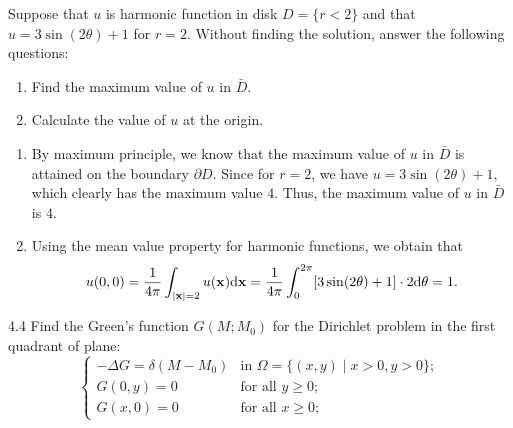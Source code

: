 \begin{question}{4.3}{}
    Suppose that $u$ is harmonic function in disk $D=\{r<2\}$ and that $u=3\sin(2\theta)+1$ for $r=2$. Without finding the solution, answer the following questions:
    \begin{enumerate}[label=(\alph*)]
        \item Find the maximum value of $u$ in $\bar{D}$.
        \item Calculate the value of $u$ at the origin.
    \end{enumerate}
\end{question}
\begin{enumerate}[label=(\alph*)]
    \item By maximum principle, we know that the maximum value of $u$ in $\bar{D}$ is attained on the boundary $\partial D$. Since for $r=2$, we have $u=3\sin(2\theta)+1$, which clearly has the maximum value $4$. Thus, the maximum value of $u$ in $\bar{D}$ is $4$.
    \item Using the mean value property for harmonic functions, we obtain that
        \[
            u(0,0) = \frac{1}{4\pi}\int_{\abs{\vb{x}}=2}u(\vb{x})\dd\vb{x} = \frac{1}{4\pi}\int_0^{2\pi}[3\sin(2\theta)+1]\cdot 2\dd\theta = 1.
        \]
\end{enumerate}


\begin{question}{4.4 }{}
    Find the Green's function $G(M;M_0)$ for the Dirichlet problem in the first quadrant of plane:
    \[
        \begin{cases}
            -\Delta G = \delta(M-M_0) & \text{in $\Omega=\{(x,y)\mid x>0, y>0\}$}; \\
            G(0,y) = 0 & \text{for all $y\geq 0$}; \\
            G(x,0) = 0 & \text{for all $x\geq 0$};
        \end{cases}
    \]
\end{question}


